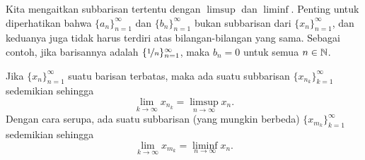 Kita mengaitkan subbarisan tertentu dengan $\limsup$ dan $\liminf$.
Penting untuk diperhatikan bahwa $\{ a_n \}_{n=1}^\infty$ dan
$\{ b_n \}_{n=1}^\infty$ bukan
subbarisan dari $\{ x_n \}_{n=1}^\infty$, dan keduanya juga tidak harus
terdiri atas bilangan-bilangan yang sama.
Sebagai contoh, jika barisannya adalah $\{ \nicefrac{1}{n} \}_{n=1}^\infty$, maka
$b_n = 0$ untuk semua $n \in {\mathbb{N}}$.

\begin{thm} \label{subseqlimsupinf:thm}
Jika $\{ x_n \}_{n=1}^\infty$ suatu barisan terbatas, maka ada suatu subbarisan
$\{ x_{n_k} \}_{k=1}^\infty$ sedemikian sehingga
\begin{equation*}
\lim_{k\to \infty} x_{n_k} = \limsup_{n \to \infty} x_n .
\end{equation*}
Dengan cara serupa, ada suatu subbarisan (yang mungkin berbeda)
$\{ x_{m_k} \}_{k=1}^\infty$ sedemikian sehingga
\begin{equation*}
\lim_{k\to \infty} x_{m_k} = \liminf_{n \to \infty} x_n .
\end{equation*}
\end{thm}

